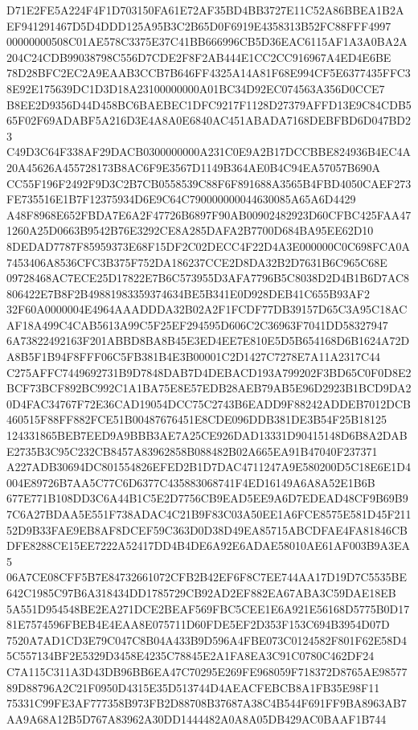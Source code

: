 \documentclass[UTF8,fontset=fandol,zihao=-4,a4paper]{ctexart}
\begin{document}
{{D71E2FE5A224F4F1D703150FA61E72AF35BD4BB3727E11C52A86BBEA1B2AEF941291467D5D4DDD125A95B3C2B65D0F6919E4358313B52FC88FFF4997
00000000508C01AE578C3375E37C41BB666996CB5D36EAC6115AF1A3A0BA2A204C24CDB99038798C556D7CDE2F8F2AB444E1CC2CC916967A4ED4E6BE
78D28BFC2EC2A9EAAB3CCB7B646FF4325A14A81F68E994CF5E6377435FFC38E92E175639DC1D3D18A23100000000A01BC34D92EC074563A356D0CCE7
B8EE2D9356D44D458BC6BAEBEC1DFC9217F1128D27379AFFD13E9C84CDB565F02F69ADABF5A216D3E4A8A0E6840AC451ABADA7168DEBFBD6D047BD23
C49D3C64F338AF29DACB0300000000A231C0E9A2B17DCCBBE824936B4EC4A20A45626A455728173B8AC6F9E3567D1149B364AE0B4C94EA57057B690A
CC55F196F2492F9D3C2B7CB0558539C88F6F891688A3565B4FBD4050CAEF273FE735516E1B7F12375934D6E9C64C790000000044630085A65A6D4429
A48F8968E652FBDA7E6A2F47726B6897F90AB00902482923D60CFBC425FAA471260A25D0663B9542B76E3292CE8A285DAFA2B7700D684BA95EE62D10
8DEDAD7787F85959373E68F15DF2C02DECC4F22D4A3E000000C0C698FCA0A7453406A8536CFC3B375F752DA186237CCE2D8DA32B2D7631B6C965C68E
09728468AC7ECE25D17822E7B6C573955D3AFA7796B5C8038D2D4B1B6D7AC8806422E7B8F2B49881983359374634BE5B341E0D928DEB41C655B93AF2
32F60A0000004E4964AAADDDA32B02A2F1FCDF77DB39157D65C3A95C18ACAF18A499C4CAB5613A99C5F25EF294595D606C2C36963F7041DD58327947
6A73822492163F201ABBD8BA8B45E3ED4EE7E810E5D5B654168D6B1624A72DA8B5F1B94F8FFF06C5FB381B4E3B00001C2D1427C7278E7A11A2317C44
C275AFFC7449692731B9D7848DAB7D4DEBACD193A799202F3BD65C0F0D8E2BCF73BCF892BC992C1A1BA75E8E57EDB28AEB79AB5E96D2923B1BCD9DA2
0D4FAC34767F72E36CAD19054DCC75C2743B6EADD9F88242ADDEB7012DCB460515F88FF882FCE51B00487676451E8CDE096DDB381DE3B54F25B18125
124331865BEB7EED9A9BBB3AE7A25CE926DAD13331D90415148D6B8A2DABE2735B3C95C232CB8457A83962858B088482B02A665EA91B47040F237371
A227ADB30694DC801554826EFED2B1D7DAC4711247A9E580200D5C18E6E1D4004E89726B7AA5C77C6D6377C435883068741F4ED16149A6A8A52E1B6B
677E771B108DD3C6A44B1C5E2D7756CB9EAD5EE9A6D7EDEAD48CF9B69B97C6A27BDAA5E551F738ADAC4C21B9F83C03A50EE1A6FCE8575E581D45F211
52D9B33FAE9EB8AF8DCEF59C363D0D38D49EA85715ABCDFAE4FA81846CBDFE8288CE15EE7222A52417DD4B4DE6A92E6ADAE58010AE61AF003B9A3EA5
06A7CE08CFF5B7E84732661072CFB2B42EF6F8C7EE744AA17D19D7C5535BE642C1985C97B6A318434DD1785729CB92AD2EF882EA67ABA3C59DAE18EB
5A551D954548BE2EA271DCE2BEAF569FBC5CEE1E6A921E56168D5775B0D1781E7574596FBEB4E4EAA8E075711D60FDE5EF2D353F153C694B3954D07D
7520A7AD1CD3E79C047C8B04A433B9D596A4FBE073C0124582F801F62E58D45C557134BF2E5329D3458E4235C78845E2A1FA8EA3C91C0780C462DF24
C7A115C311A3D43DB96BB6EA47C70295E269FE968059F718372D8765AE9857789D88796A2C21F0950D4315E35D513744D4AEACFEBCB8A1FB35E98F11
75331C99FE3AF777358B973FB2D88708B37687A38C4B544F691FF9BA8963AB7AA9A68A12B5D767A83962A30DD1444482A0A8A05DB429AC0BAAF1B744
}}
\end{document}
